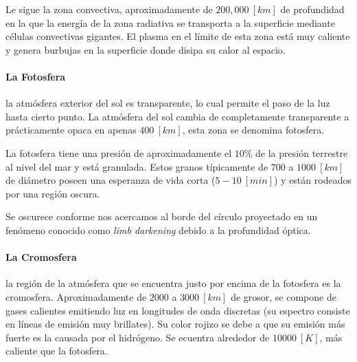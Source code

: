 \documentclass{tufte-handout}
\begin{document}
Le sigue la zona convectiva, aproximadamente de $200,000~[km]$ de profundidad en la que la energía de la zona radiativa se transporta a la superficie mediante células convectivas gigantes. El plasma en el límite de esta zona está muy caliente y genera burbujas en la superficie donde disipa su calor al espacio.

\paragraph{La Fotosfera} la atmósfera exterior del sol es transparente, lo cual permite el paso de la luz hasta cierto punto. La atmósfera del sol cambia de completamente transparente a prácticamente opaca en apenas $400~[km]$, esta zona se denomina fotosfera.

La fotosfera tiene una presión de aproximadamente el $10\%$ de la presión terrestre al nivel del mar y está granulada. Estos granos típicamente de $700$ a $1000~[km]$ de diámetro poseen una esperanza de vida corta ($5-10~[min]$) y están rodeados por una región oscura.

Se oscurece conforme nos acercamos al borde del círculo proyectado en un fenómeno conocido como \emph{limb darkening} debido a la profundidad óptica.

\paragraph{La Cromosfera} la región de la atmósfera que se encuentra justo por encima de la fotosfera es la cromosfera. Aproximadamente de $2000$ a $3000~[km]$ de grosor, se compone de gases calientes emitiendo luz en longitudes de onda discretas (su espectro consiste en líneas de emisión muy brillates). Su color rojizo se debe a que su emisión más fuerte es la causada por el hidrógeno. Se ecuentra alrededor de $10000~[K]$, más caliente que la fotosfera.
\end{document}

